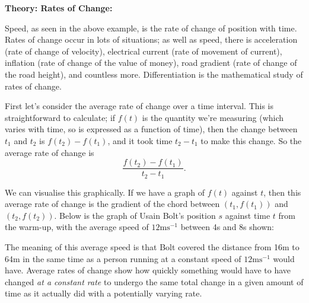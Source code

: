 \documentclass{article}
\begin{document}
\clearpage


{\bf Theory: Rates of Change:}

\vspace{5mm}

Speed, as seen in the above example, is the rate of change of position with time. Rates of change occur in lots of situations; as well as speed, there is acceleration (rate of change of velocity), electrical current (rate of movement of current), inflation (rate of change of the value of money), road gradient (rate of change of the road height), and countless more. Differentiation is the mathematical study of rates of change.\bigskip


First let's consider the average rate of change over a time interval. This is straightforward to calculate; if $f(t)$ is the quantity we're measuring (which varies with time, so is expressed as a function of time), then the change between $t_1$ and $t_2$ is $f(t_2)-f(t_1)$, and it took time $t_2-t_1$ to make this change. So the average rate of change is
\[\frac{f(t_2)-f(t_1)}{t_2-t_1}.\]


We can visualise this graphically. If we have a graph of $f(t)$ against $t$, then this average rate of change is the gradient of the chord between $(t_1,f(t_1))$ and $(t_2,f(t_2))$. Below is the graph of Usain Bolt's position $s$ against time $t$ from the warm-up, with the average speed of $12\mathrm{ms}^{-1}$ between 4s and 8s shown:

\begin{center}
\end{center}



The meaning of this average speed is that Bolt covered the distance from 16m to 64m in the same time as a person running at a constant speed of $12\mathrm{ms}^{-1}$ would have. Average rates of change show how quickly something would have to have changed \textit{at a constant rate} to undergo the same total change in a given amount of time as it actually did with a potentially varying rate.\bigskip
\end{document}
